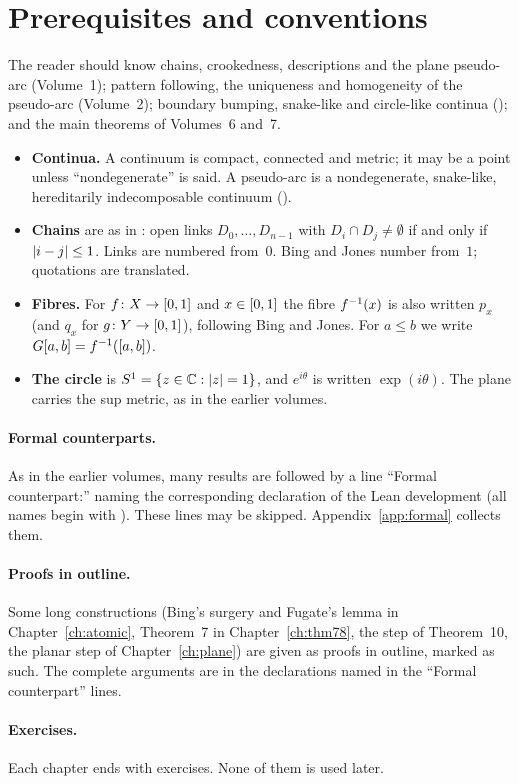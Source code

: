 \section{Prerequisites and conventions}\label{sec:intro-conv}

The reader should know chains, crookedness, descriptions and the plane pseudo-arc (Volume~1); pattern following, the uniqueness and homogeneity of the
pseudo-arc (Volume~2); boundary bumping, snake-like and circle-like continua (); and the main theorems of Volumes~6 and~7.

\begin{itemize}
\item \textbf{Continua.} A continuum is compact, connected and metric; it may be a point unless ``nondegenerate'' is said. A pseudo-arc is a nondegenerate,
snake-like, hereditarily indecomposable continuum ().
\item \textbf{Chains} are as in : open links $D_0,\dots,D_{n-1}$ with $D_i\cap D_j\ne\emptyset$ if and only if $\left\lvert i-j\right\rvert\le1$. Links are
numbered from~$0$. Bing and Jones number from~$1$; quotations are translated.
\item \textbf{Fibres.} For $f\colon X\to[0,1]$ and $x\in[0,1]$ the fibre $f^{-1}(x)$ is also written $p_x$ (and $q_x$ for $g\colon Y\to[0,1]$), following Bing and Jones.
For $a\le b$ we write $G[a,b]=f^{-1}([a,b])$.
\item \textbf{The circle} is $S^1=\left\{ z\in\mathbb{C}:\left\lvert z\right\rvert=1 \right\}$, and $e^{i\theta}$ is written $\exp(i\theta)$. The plane carries the sup metric, as in the earlier
volumes.
\end{itemize}

\paragraph{Formal counterparts.} As in the earlier volumes, many results are followed by a line ``Formal counterpart:'' naming the corresponding declaration of the
Lean development (all names begin with ). These lines may be skipped. Appendix~\ref{app:formal} collects them.

\paragraph{Proofs in outline.} Some long constructions (Bing's surgery and Fugate's lemma in Chapter~\ref{ch:atomic}, Theorem~7 in Chapter~\ref{ch:thm78}, the
step of Theorem~10, the planar step of Chapter~\ref{ch:plane}) are given as proofs in outline, marked as such. The complete arguments are in the declarations named in the ``Formal counterpart'' lines.

\paragraph{Exercises.} Each chapter ends with exercises. None of them is used later.
